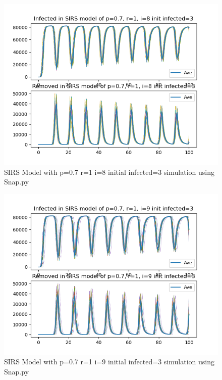 \documentclass{subfile}
\begin{document}
  \begin{figure}
  \includegraphics[scale=0.8]{sirsp07r1i8s3}
  \caption[SIRS p=0.7,r=1,i=8,init infected=3]{SIRS Model with p=0.7 r=1 i=8 initial infected=3 simulation using Snap.py}
  \end{figure}
  \begin{figure}
  \includegraphics[scale=0.8]{sirsp07r1i9s3}
  \caption[SIRS p=0.7,r=1,i=9,init infected=3]{SIRS Model with p=0.7 r=1 i=9 initial infected=3 simulation using Snap.py}
  \end{figure}
\end{document}
